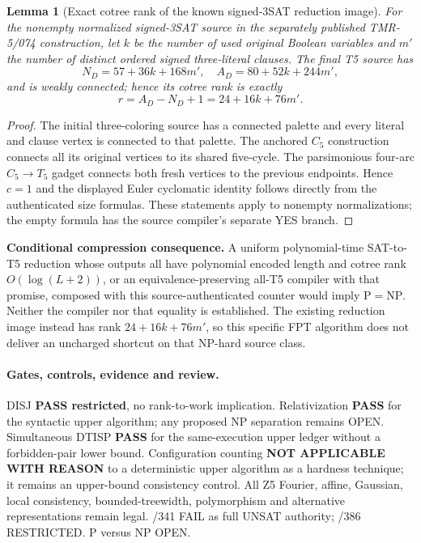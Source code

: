\documentclass[11pt]{article}
\newtheorem{lemma}{Lemma}
\begin{document}
\begin{lemma}[Exact cotree rank of the known signed-3SAT reduction image]
For the nonempty normalized signed-3SAT source in the separately
published TMR-5/074 construction, let $k$ be the number of used
original Boolean variables and $m'$ the number of distinct ordered
signed three-literal clauses. The final T5 source has
\[
 N_D=57+36k+168m',\quad
 A_D=80+52k+244m',
\]
and is weakly connected; hence its cotree rank is exactly
\[
 \boxed{r=A_D-N_D+1=24+16k+76m'.}
\]
\end{lemma}
\begin{proof}
The initial three-coloring source has a connected palette and
every literal and clause vertex is connected to that palette.
The anchored $C_5$ construction connects all its original
vertices to its shared five-cycle. The parsimonious four-arc
$C_5\to T_5$ gadget connects both fresh vertices to the
previous endpoints. Hence $c=1$ and the displayed Euler
cyclomatic identity follows directly from the authenticated
size formulas. These statements apply to nonempty normalizations;
the empty formula has the source compiler's separate YES branch.
\end{proof}

\noindent\textbf{Conditional compression consequence.}
A uniform polynomial-time SAT-to-T5 reduction whose outputs all
have polynomial encoded length and cotree rank
$O(\log(L+2))$, or an equivalence-preserving all-T5 compiler
with that promise, composed with this source-authenticated
counter would imply $\mathrm P=\mathrm{NP}$. Neither the compiler
nor that equality is established. The existing reduction image
instead has rank $24+16k+76m'$, so this specific FPT algorithm
does not deliver an uncharged shortcut on that NP-hard source class.

\paragraph{Gates, controls, evidence and review.}
DISJ \textbf{PASS restricted}, no rank-to-work implication.
Relativization \textbf{PASS} for the syntactic upper algorithm;
any proposed NP separation remains OPEN. Simultaneous DTISP
\textbf{PASS} for the same-execution upper ledger without a
forbidden-pair lower bound. Configuration counting
\textbf{NOT APPLICABLE WITH REASON} to a deterministic upper
algorithm as a hardness technique; it remains an upper-bound
consistency control. All Z5 Fourier, affine, Gaussian, local
consistency, bounded-treewidth, polymorphism and alternative
representations remain legal. /341 FAIL as full UNSAT authority;
 /386 RESTRICTED. P versus NP OPEN.
\end{document}
